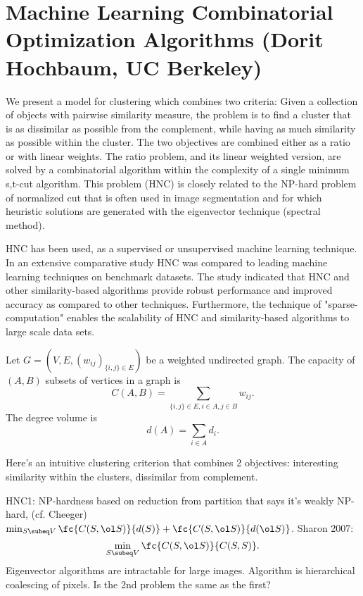 \section{Machine Learning Combinatorial Optimization Algorithms  (Dorit Hochbaum, UC Berkeley)}


We present a model for clustering which combines two criteria: Given a collection of objects with pairwise similarity measure, the problem is to find a cluster that is as dissimilar as possible from the complement, while having as much similarity as possible within the cluster. The two objectives are combined either as a ratio or with linear weights. The ratio problem, and its linear weighted version, are solved by a combinatorial algorithm within the complexity of a single minimum s,t-cut algorithm. This problem (HNC) is closely related to the NP-hard problem of normalized cut that is often used in image segmentation and for which heuristic solutions are generated with the eigenvector technique (spectral method).

HNC has been used, as a supervised or unsupervised machine learning technique. In an extensive comparative study HNC was compared to leading machine learning techniques on benchmark datasets.  The study indicated that HNC and other similarity-based algorithms provide robust performance and improved accuracy as compared to other techniques.  Furthermore, the technique of "sparse-computation" enables the scalability  of HNC and similarity-based algorithms to large scale data sets.

Let $G = (V,E,(w_{ij})_{\{i,j\}\in E})$ be a weighted undirected graph.
The capacity of $(A,B)$ subsets of vertices in a graph is $$C(A,B)=\sum_{\{i,j\}\in E, i\in A, j\in B} w_{ij}.$$
The degree volume is $$d(A)=\sum_{i\in A} d_i.$$ %

Here's an intuitive clustering criterion that combines 2 objectives: interesting similarity within the clusters, dissimilar from complement.

HNC1: 
NP-hardness based on reduction from partition that says it's weakly NP-hard, (cf. Cheeger) $\min_{S\subeq V}\fc{C(S,\ol S)}{d(S)}+\fc{C(S,\ol S)}{d(\ol S)}$. 
Sharon 2007: 
$$\min_{S\subeq V} \fc{C(S,\ol S)}{C(S,S)}.$$
Eigenvector algorithms are intractable for large images. 
Algorithm is hierarchical coalescing of pixels. Is the 2nd problem the same as the first? 


